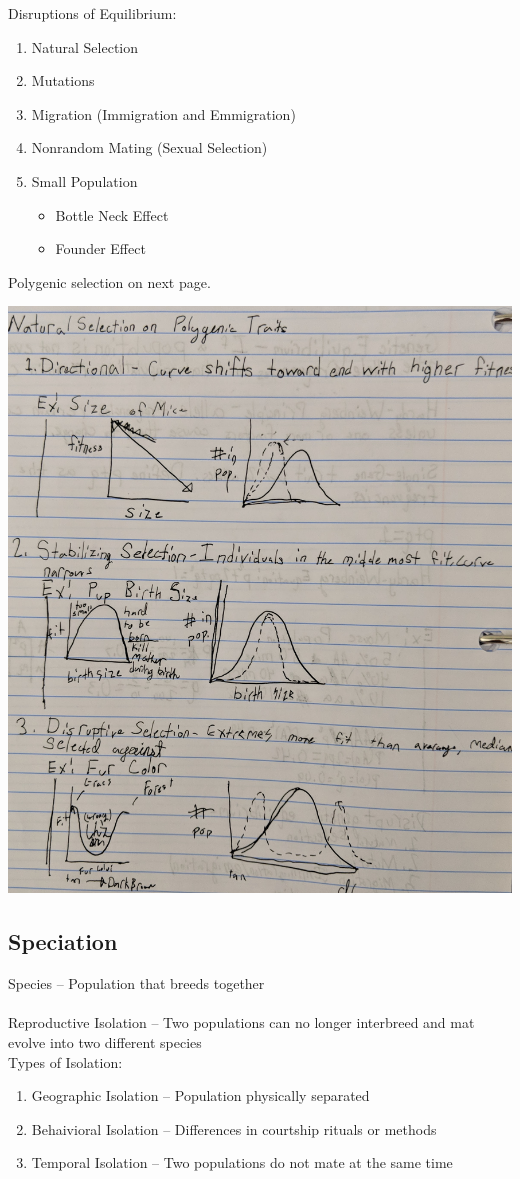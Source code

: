 \documentclass{article}
\begin{document}
Disruptions of Equilibrium:\\
\begin{enumerate}
\item Natural Selection
\item Mutations
\item Migration (Immigration and Emmigration)
\item Nonrandom Mating (Sexual Selection)
\item Small Population
\begin{itemize}
\item Bottle Neck Effect
\item Founder Effect
\end{itemize}
\end{enumerate}
Polygenic selection on next page.

\includegraphics[scale=0.2]{multigenegraphs}
\subsection{Speciation}
Species -- Population that breeds together\\
\\
Reproductive Isolation -- Two populations can no longer interbreed and mat evolve into two different species\\
Types of Isolation:
\begin{enumerate}
\item Geographic Isolation -- Population physically separated
\item Behaivioral Isolation -- Differences in courtship rituals or methods
\item Temporal Isolation -- Two populations do not mate at the same time
\end{enumerate}
\end{document}
